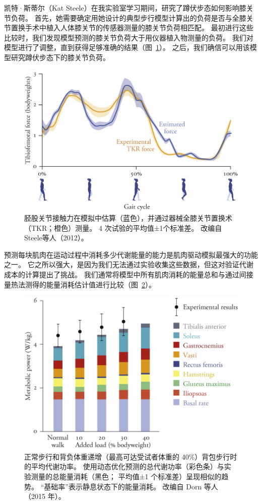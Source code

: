 凯特·斯蒂尔（Kat Steele）在我实验室学习期间，研究了蹲伏步态如何影响膝关节负荷。
首先，她需要确定用她设计的典型步行模型计算出的负荷是否与全膝关节置换手术中植入人体膝关节的传感器测量的膝关节负荷相匹配。
最初进行这些比较时，我们发现模型预测的膝关节负荷大于用仪器植入物测量的负荷。
我们对模型进行了调整，直到获得足够准确的结果（图~\ref{fig:10_12}）。
之后，我们确信可以用该模型研究蹲伏步态下的膝关节负荷。

\begin{figure}[!htb]
	\centering
	\includegraphics[width=0.8\linewidth]{chap10/10_12}
	\caption{胫股关节接触力在模拟中估算（蓝色），并通过器械全膝关节置换术（TKR；橙色）测量。
		4 次试验的平均值±1个标准差。
		改编自Steele等人（2012）。 \label{fig:10_12}}
\end{figure}

预测每块肌肉在运动过程中消耗多少代谢能量的能力是肌肉驱动模拟最强大的功能之一。
它之所以强大，是因为我们无法通过实验收集这些数据，但这对验证代谢成本的计算提出了挑战。
我们通常将模型中所有肌肉消耗的能量总和与通过间接量热法测得的能量消耗估计值进行比较（图~\ref{fig:10_13}）。

\begin{figure}[!htb]
	\centering
	\includegraphics[width=0.8\linewidth]{chap10/10_13}
	\caption{正常步行和背负体重递增（最高可达受试者体重的 40\%）背包步行时的平均代谢功率。
		使用动态优化预测的总代谢功率（彩色条）与实验测量的总能量消耗（黑色；
		平均值±1 个标准差）呈现相似的趋势。
		“基础率”表示静息状态下的能量消耗。
		改编自 Dorn 等人（2015 年）。 \label{fig:10_13}}
\end{figure}

